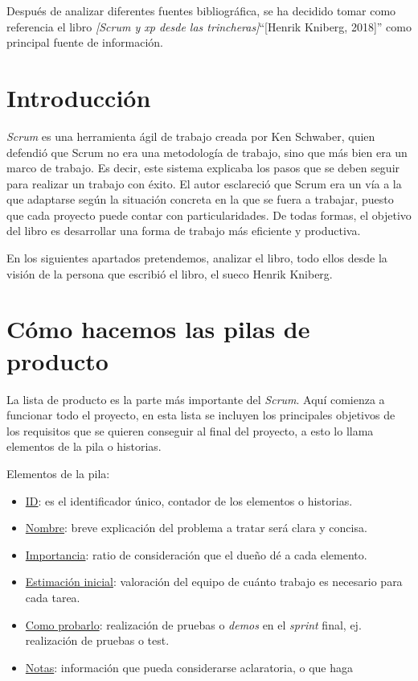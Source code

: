 
Después de analizar diferentes fuentes bibliográfica, se ha decidido tomar como referencia el libro \textit{[Scrum y xp desde las trincheras]}``[Henrik Kniberg, 2018]''\cite{libro} como principal fuente de información.

\section{Introducción}

\textit{Scrum} es una herramienta ágil de trabajo creada por Ken Schwaber, quien defendió que Scrum no era una metodología de trabajo, sino que más bien era un marco de trabajo. Es decir, este sistema explicaba los pasos que se deben seguir para realizar un trabajo con éxito. El autor esclareció que Scrum era un vía a la que adaptarse según la situación concreta en la que se fuera a trabajar, puesto que cada proyecto puede contar con particularidades. De todas formas, el objetivo del libro es desarrollar una forma de trabajo más eficiente y productiva.

En los siguientes apartados pretendemos, analizar el libro, todo ellos desde la visión de la persona que escribió el libro, el sueco Henrik Kniberg.

\section{Cómo hacemos las pilas de producto}

La lista de producto es la parte más importante del \textit{Scrum}. Aquí comienza a funcionar todo el proyecto, en esta lista se incluyen los principales objetivos de los requisitos que se quieren conseguir al final del proyecto, a esto lo llama elementos de la pila o historias.

Elementos de la pila:
\begin{itemize}
	\item \underline{ID}: es el identificador único, contador de los elementos o historias.
	\item \underline{Nombre}: breve explicación del problema a tratar será clara y concisa.
	\item \underline{Importancia}: ratio de consideración que el dueño dé a cada
	elemento.
	\item \underline{Estimación inicial}: valoración del equipo de cuánto trabajo es
	necesario para cada tarea.
	\item \underline{Como probarlo}: realización de pruebas o \textit{demos} en el  \textit{sprint} final, ej.
	realización de pruebas o test.
	\item \underline{Notas}: información que pueda considerarse aclaratoria, o que haga
\end{itemize}

